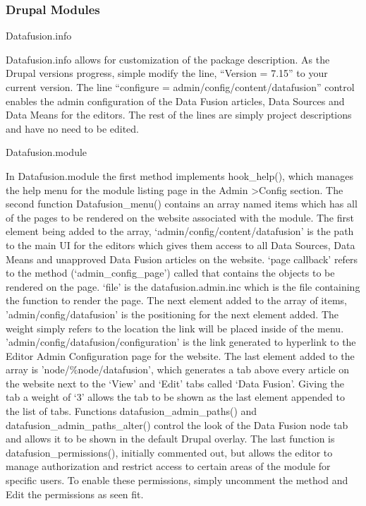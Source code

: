 \documentclass[10pt]{article} %
\begin{document}
\subsubsection{Drupal Modules}

Datafusion.info

Datafusion.info allows for customization of the package description. As the Drupal versions progress, simple modify the line, “Version = 7.15” to your current version. The line “configure = admin/config/content/datafusion” control enables the admin configuration of the Data Fusion articles, Data Sources and Data Means for the editors.  The rest of the lines are simply project descriptions and have no need to be edited.

Datafusion.module

In Datafusion.module the first method implements hook\_help(), which manages the help menu for the module listing page in the Admin \textgreater Config section. The second function Datafusion\_menu() contains an array named items which has all of the pages to be rendered on the website associated with the module. The first element being added to the array, ‘admin/config/content/datafusion’ is the path to the main UI for the editors which gives them access to all Data Sources, Data Means and unapproved Data Fusion articles on the website. ‘page callback’ refers to the method (‘admin\_config\_page’) called that contains the objects to be rendered on the page. ‘file’ is the datafusion.admin.inc which is the file containing the function to render the page. The next element added to the array of items, 'admin/config/datafusion' is the positioning for the next element added. The weight simply refers to the location the link will be placed inside of the menu. 'admin/config/datafusion/configuration' is the link generated to hyperlink to the Editor Admin Configuration page for the website. The last element added to the array is 'node/\%node/datafusion', which generates a tab above every article on the website next to the ‘View’ and ‘Edit’ tabs called ‘Data Fusion’. Giving the tab a weight of ‘3’ allows the tab to be shown as the last element appended to the list of tabs. Functions datafusion\_admin\_paths() and datafusion\_admin\_paths\_alter() control the look of the Data Fusion node tab and allows it to be shown in the default Drupal overlay. The last function is datafusion\_permissions(), initially commented out, but allows the editor to manage authorization and restrict access to certain areas of the module for specific users. To enable these permissions, simply uncomment the method and Edit the permissions as seen fit.
\end{document}
